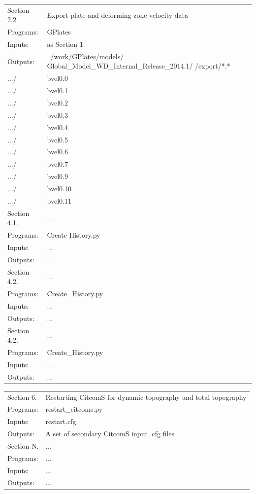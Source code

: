 \documentclass[letterpaper,12pt]{article}
\newcommand{\gplatesmodel}{Global\_Model\_WD\_Internal\_Release\_2014.1/ }
\begin{document}
\begin{itemize}
\begin{tabular}{ | l | l | }
  \hline \hline
  Section 2.2 & Export plate and deforming zone velocity data \\
  Programs: & GPlates \\
  Inputs: & as Section 1. \\
  Outputs: & ~/work/GPlates/models/ \gplatesmodel /export/*.* \\
\hline
.../ & bvel0.0 \\
.../ & bvel0.1 \\
.../ & bvel0.2 \\
.../ & bvel0.3 \\
.../ & bvel0.4 \\
.../ & bvel0.5 \\
.../ & bvel0.6 \\
.../ & bvel0.7 \\
.../ & bvel0.9 \\
.../ & bvel0.10 \\
.../ & bvel0.11 \\

  \hline \hline
  Section 4.1. & ... \\
  Programs: & Create History.py \\
  Inputs: & ... \\
  Outputs: & ... \\

  \hline \hline
  Section 4.2. & ... \\
  Programs: & Create\_History.py \\
  Inputs: & ... \\
  Outputs: & ... \\

  \hline \hline
  Section 4.2. & ... \\
  Programs: & Create\_History.py \\
  Inputs: & ... \\
  Outputs: & ... \\

  \hline \hline

\end{tabular}

\scriptsize
\begin{tabular}{ | l | l | }

  \hline \hline \hline
  Section 6. & Restarting CitcomS for dynamic topography and total topography \\
  Programs: & restart\_citcoms.py \\
  Inputs: & restart.cfg \\
  Outputs: & A set of secondary CitcomS input .cfg files \\
  \hline \hline \hline

  \hline \hline \hline
  Section N. & ... \\
  Programs: & ... \\
  Inputs: & ... \\
  Outputs: & ... \\
  \hline \hline \hline

\end{tabular}

\end{itemize}
\end{document}
